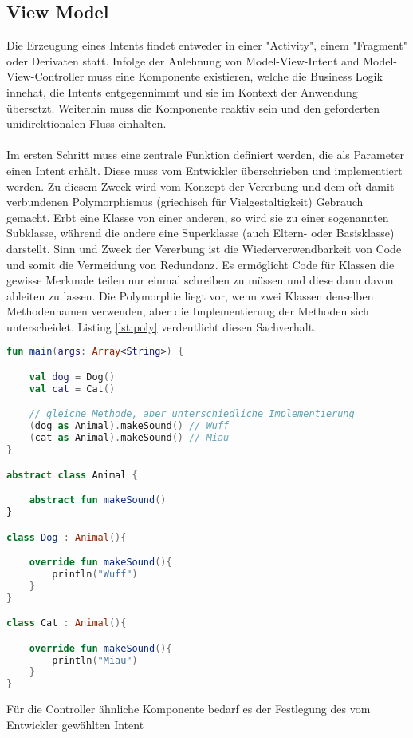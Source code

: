 \subsection{View Model}
Die Erzeugung eines Intents findet entweder in einer "Activity", einem "Fragment" oder Derivaten statt. 
Infolge der Anlehnung von Model-View-Intent and Model-View-Controller muss eine Komponente existieren, 
welche die Business Logik innehat, die Intents entgegennimmt und sie im Kontext der Anwendung übersetzt. 
Weiterhin muss die Komponente reaktiv sein und den geforderten unidirektionalen Fluss einhalten.
\\
\\
Im ersten Schritt muss eine zentrale Funktion definiert werden, die als Parameter einen Intent erhält.
Diese muss vom Entwickler überschrieben und implementiert werden.
Zu diesem Zweck wird vom Konzept der Vererbung und dem oft damit verbundenen Polymorphismus (griechisch 
für Vielgestaltigkeit) Gebrauch gemacht. Erbt eine Klasse von einer anderen, so wird sie zu einer 
sogenannten Subklasse, während die andere eine Superklasse (auch Eltern- oder Basisklasse) darstellt. 
Sinn und Zweck der Vererbung ist die Wiederverwendbarkeit von Code und somit die Vermeidung von 
Redundanz. Es ermöglicht Code für Klassen die gewisse Merkmale teilen nur einmal schreiben zu müssen und 
diese dann davon ableiten zu lassen. Die Polymorphie liegt vor, wenn  zwei Klassen denselben 
Methodennamen verwenden, aber die Implementierung der Methoden sich unterscheidet.
Listing 
\ref{lst:poly}
verdeutlicht diesen Sachverhalt.
\begin{lstlisting}[caption={Vererbung \& Polymorphismus}, label={lst:poly}, language=Kotlin]
fun main(args: Array<String>) {

	val dog = Dog()
	val cat = Cat()

	// gleiche Methode, aber unterschiedliche Implementierung
	(dog as Animal).makeSound() // Wuff
	(cat as Animal).makeSound() // Miau
}

abstract class Animal {

	abstract fun makeSound()
}

class Dog : Animal(){

	override fun makeSound(){
		println("Wuff")
	}
}

class Cat : Animal(){

	override fun makeSound(){
		println("Miau")
	}
}
\end{lstlisting}
\bigskip
Für die Controller ähnliche Komponente bedarf es der Festlegung des vom Entwickler gewählten Intent 
